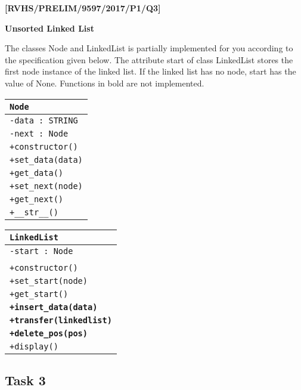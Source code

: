 \item \textbf{{[}RVHS/PRELIM/9597/2017/P1/Q3{]} }

\textbf{Unsorted Linked List}

The classes Node and LinkedList is partially implemented for you according
to the specification given below. The attribute start of class LinkedList
stores the first node instance of the linked list. If the linked list
has no node, start has the value of None. Functions in bold are not
implemented. 
\begin{center}
\texttt{}%
\begin{tabular}{|l|}
\hline 
\texttt{\hspace{0.25\columnwidth}Node}\tabularnewline
\hline 
\texttt{-data : STRING}\tabularnewline
\texttt{-next : Node}\tabularnewline
\hline 
\texttt{+constructor()}\tabularnewline
\texttt{+set\_data(data)}\tabularnewline
\texttt{+get\_data()}\tabularnewline
\texttt{+set\_next(node)}\tabularnewline
\texttt{+get\_next()}\tabularnewline
\texttt{+\_\_str\_\_()}\tabularnewline
\hline 
\end{tabular}\texttt{}%
\begin{tabular}{|l|}
\hline 
\texttt{\hspace{0.25\columnwidth}LinkedList}\tabularnewline
\hline 
\texttt{-start : Node}\tabularnewline
\tabularnewline
\hline 
\texttt{+constructor()}\tabularnewline
\texttt{+set\_start(node)}\tabularnewline
\texttt{+get\_start()}\tabularnewline
\texttt{\textbf{+insert\_data(data)}}\tabularnewline
\texttt{\textbf{+transfer(linkedlist)}}\tabularnewline
\texttt{\textbf{+delete\_pos(pos)}}\tabularnewline
\texttt{+display() }\tabularnewline
\hline 
\end{tabular}
\par\end{center}

\subsection*{Task 3}

